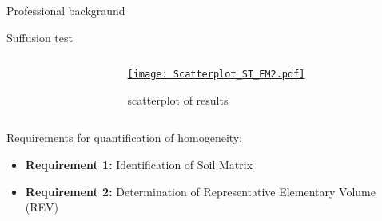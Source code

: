 \documentclass[10pt,xcolor=dvipsnames]{beamer}
\begin{document}
{\begin{frame}{Professional backgraund}
\begin{frame}[fragile]{Suffusion test}
\begin{columns}
\begin{column}{.46\textwidth}
\end{column}%
\begin{column}{.53\textwidth}
\begin{figure}
	\centering
		\hyperlink{img2_Scaterplot}{  \texttt{[image: Scatterplot\_ST\_EM2.pdf]}  }
		\vspace{-0.4cm}
	\caption{scatterplot of results }
	\label{fig:Fig4_ST_4L}
\end{figure}

\end{column}%
\end{columns}
	Requirements for quantification of homogeneity:\\
	\begin{itemize}
	\item \textbf{Requirement 1:} Identification of Soil Matrix
	\item \textbf{Requirement 2:} Determination of Representative Elementary Volume (REV)
	\end{itemize}
\end{frame}

%
%




\end{frame}}
\end{document}
